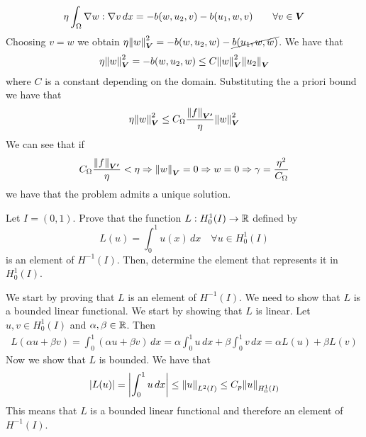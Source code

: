 \begin{enumerate}
\[\begin{split}
                  \eta \int_\Omega \nabla w : \nabla v \, dx= -b(w, u_2, v) - b(u_1, w, v) \qquad \forall v \in \bm{V}
              \end{split}
          \]
          Choosing \(v = w\) we obtain \(\eta \norm{w}_{\bm{V}}^2 = -b(w, u_2, w) -
          \cancel{b(u_1, w, w)}\). We have that
          \[
              \begin{split}
                  \eta \norm{w}_{\bm{V}}^2 = -b(w, u_2, w) \leq C \norm{w}_{\bm{V}}^2 \norm{u_2}_{\bm{V}}
              \end{split}
          \]
          where \(C\) is a constant depending on the domain. Substituting the a priori
          bound we have that
          \[
              \begin{split}
                  \eta \norm{w}_{\bm{V}}^2 \leq C_\Omega \frac{\norm{f}_{\bm{V'}}}{\eta} \norm{w}_{\bm{V}}^2
              \end{split}
          \]
          We can see that if
          \[
              \begin{split}
                  C_\Omega \frac{\norm{f}_{\bm{V'}}}{\eta} < \eta \Rightarrow \norm{w}_{\bm{V}} = 0 \Rightarrow w = 0 \Rightarrow \gamma = \frac{\eta^2}{C_\Omega}
              \end{split}
          \]
          we have that the problem admits a unique solution.

\end{enumerate}

\newpage
\begin{exercise}
    Let \(I = (0,1)\). Prove that the function \(L: H^1_0(I) \to \mathbb{R}\) defined by
    \[
        L(u) = \int_0^1 u(x) \, dx \quad \forall u \in H^1_0(I)
    \]
    is an element of \(H^{-1}(I)\). Then, determine the element that represents it
    in \(H^1_0(I)\).
\end{exercise}
We start by proving that \(L\) is an element of \(H^{-1}(I)\). We need to show that \(L\) is a bounded linear functional. We start by showing that \(L\) is linear. Let \(u, v \in H^1_0(I)\) and \(\alpha, \beta \in \mathbb{R}\). Then
\[
    \begin{split}
        L(\alpha u + \beta v) = \int_0^1 (\alpha u + \beta v) \, dx = \alpha \int_0^1 u \, dx + \beta \int_0^1 v \, dx = \alpha L(u) + \beta L(v)
    \end{split}
\]
Now we show that \(L\) is bounded. We have that
\[
    \begin{split}
        \abs{L(u)} = \abs{\int_0^1 u \, dx} \leq \norm{u}_{L^2(I)} \leq C_p \norm{u}_{H^1_0(I)}
    \end{split}
\]
This means that \(L\) is a bounded linear functional and therefore an element
of \(H^{-1}(I)\).

